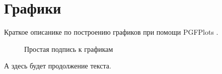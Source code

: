 \chapter{Графики}
\label{ch:plot}

Краткое описанике по построению графиков при помощи PGFPlots \cite{habrpgfplots}.

	\begin{figure}[ht]
        \centering
		\caption{Простая подпись к графикам}\label{}
	\end{figure}

А здесь будет продолжение текста.
\endinput